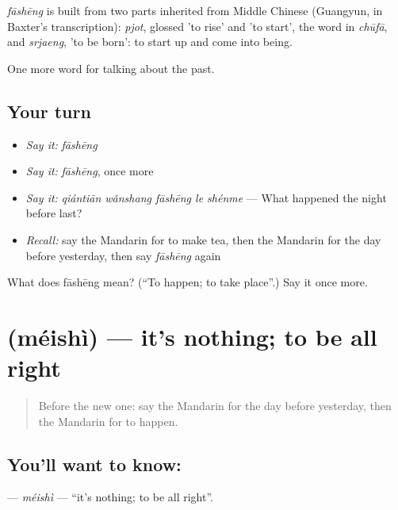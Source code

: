 \begin{cousinweb}
\emph{fāshēng} is built from two parts inherited from Middle Chinese (Guangyun, in Baxter's transcription): \emph{pjot}, glossed 'to rise' and 'to start', the word in \emph{chūfā}, and \emph{srjaeng},  'to be born': to start up and come into being.
\end{cousinweb}

\begin{grammarlens}[title={What you've built}]
One more word for talking about the past.
\end{grammarlens}

\subsection*{Your turn}
\begin{itemize}
\raggedright
  \item \emph{Say it:} \emph{fāshēng}
  \item \emph{Say it:} \emph{fāshēng}, once more
  \item \emph{Say it:} \emph{qiántiān wǎnshang fāshēng le shénme} — What happened the night before last?
  \item \emph{Recall:} say the Mandarin for to make tea, then the Mandarin for the day before yesterday, then say \emph{fāshēng} again
\end{itemize}

\begin{tcolorbox}[breakable,colback=teal!4,colframe=teal!35!black,title={Before you move on}]
What does fāshēng mean? (\textquotedblleft{}To happen; to take place\textquotedblright{}.) Say it once more.
\end{tcolorbox}
\section[\texorpdfstring{\zh{没事} (méishì)}{没事 (méishì)}]{ (méishì) — it's nothing; to be all right}

\label{lesson:ZH-C167-meishi}



\begin{quote}
Before the new one: say the Mandarin for the day before yesterday, then the Mandarin for to happen.
\end{quote}

\subsection*{You'll want to know: }
\textbf{} — \emph{méishì} — \textquotedblleft{}it's nothing; to be all right\textquotedblright{}.

